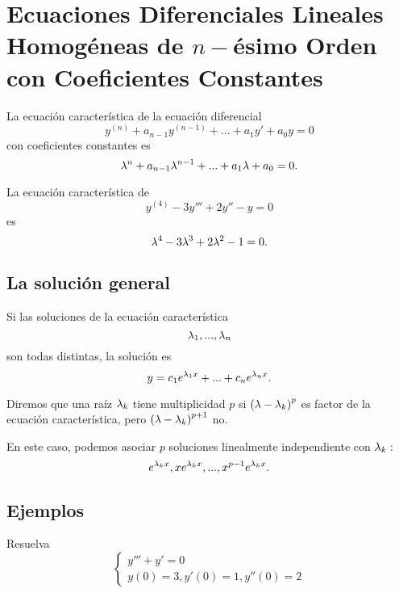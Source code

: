 \section{Ecuaciones Diferenciales Lineales Homog\'eneas de $n-$\'esimo Orden con Coeficientes Constantes}


La ecuaci\'on caracter\'istica de la ecuaci\'on diferencial
\begin{equation}
	\label{bron:10.1}
	y^{(n)}+a_{n-1}y^{(n-1)}+...+a_{1}y'+a_{0}y=0
\end{equation}
con coeficientes constantes es
\begin{equation}
	\label{bron:10.2}
	\lambda^{n}+a_{n-1}\lambda^{n-1}+...+a_{1}\lambda+a_{0}=0.
\end{equation}




La ecuaci\'on caracter\'istica de
$$
y^{(4)}-3y'''+2y''-y=0
$$
es
$$
\lambda^{4}-3\lambda^{3}+2\lambda^{2}-1=0.
$$


\subsection{La soluci\'on general}


Si las soluciones de la ecuaci\'on caracter\'istica
$$
\lambda_{1},...,\lambda_{n}
$$ son todas distintas, la soluci\'on es
\begin{equation}
	\label{bron:10.3}
	y=c_{1}e^{\lambda_{1}x}+...+c_{n}e^{\lambda_{n}x}.
\end{equation}




Diremos que una ra\'iz $\lambda_{k}$ tiene multiplicidad $p$ si $\left( \lambda-\lambda_{k} \right)^{p}$ es factor de la ecuaci\'on caracter\'istica, pero $\left( \lambda-\lambda_{k} \right)^{p+1}$ no.

En este caso, podemos asociar $p$ soluciones linealmente independiente con $\lambda_{k}:$
$$
e^{\lambda_{k}x}, xe^{\lambda_{k}x},..., x^{p-1}e^{\lambda_{k}x}.
$$


\subsection{Ejemplos}


\begin{problema}
	Resuelva $$\begin{cases}
		y'''+y'=0\\
		y(0)=3, y'(0)=1, y''(0)=2
	\end{cases}
	$$
\end{problema}




